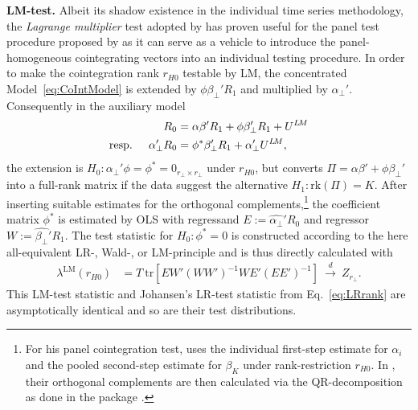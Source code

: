 \textbf{LM-test.} Albeit its shadow existence in the individual time series methodology, the \textit{Lagrange multiplier} test adopted by \cite{LuukkonenEtAl1999} has proven useful for the panel test procedure proposed by \cite{Breitung2005} as it can serve as a vehicle to introduce the panel-homogeneous cointegrating vectors into an individual testing procedure. In order to make the cointegration rank $ r_{H0} $ testable by LM, the concentrated Model~\eqref{eq:CoIntModel} is extended by $ \phi \beta_\perp' R_{1} $ and multiplied by $ \alpha_\perp' $. Consequently in the auxiliary model
\begin{align} \label{eq:auxLMrank}
\begin{split}
	R_{0} & = \alpha \beta' R_{1} + \phi \beta_\perp' R_{1} + U^{{L \! M}} \\
	\text{resp. \quad}	\alpha_\perp' R_{0} & = \phi^* \beta_\perp' R_{1} + \alpha_\perp' U^{{L \! M}},
\end{split}
\end{align}
the extension is $ H_0: \alpha_\perp' \phi = \phi^* = 0_{r_\perp \times r_\perp} $ under $ r_{H0} $, but converts $ \Pi = \alpha \beta' + \phi \beta_\perp' $ into a full-rank matrix if the data suggest the alternative $ H_1: \text{rk}(\Pi) = K $. After inserting suitable estimates for the orthogonal complements,\footnote{For his panel cointegration test, \citet{Breitung2005} uses the individual first-step estimate for $ \alpha_i $ and the pooled second-step estimate for $ \beta_K $ under rank-restriction $ r_{H0} $. In , their orthogonal complements are then calculated via the QR-decomposition as done in the  package \citep{VenablesRipley2002}.} the coefficient matrix $ \phi^* $ is estimated by OLS with regressand $ E := \widehat{\alpha_\perp}' R_0 $ and regressor $ W := \widehat{\beta_\perp}' R_1 $. The test statistic for $ H_0: \phi^* = 0 $ is constructed according to the here all-equivalent LR-, Wald-, or LM-principle and is thus directly calculated with
\begin{align} \label{eq:LMrank}
	\lambda^{\text{LM}} \left( r_{H0} \right) & = T \ \text{tr} \left[ EW' \left( WW' \right)^{-1} WE' \left( EE' \right)^{-1} \right] \ \overset{d}{\longrightarrow} \ Z_{r_\perp}.
\end{align}
This LM-test statistic and Johansen's LR-test statistic from Eq.~\eqref{eq:LRrank} are asymptotically identical and so are their test distributions.


